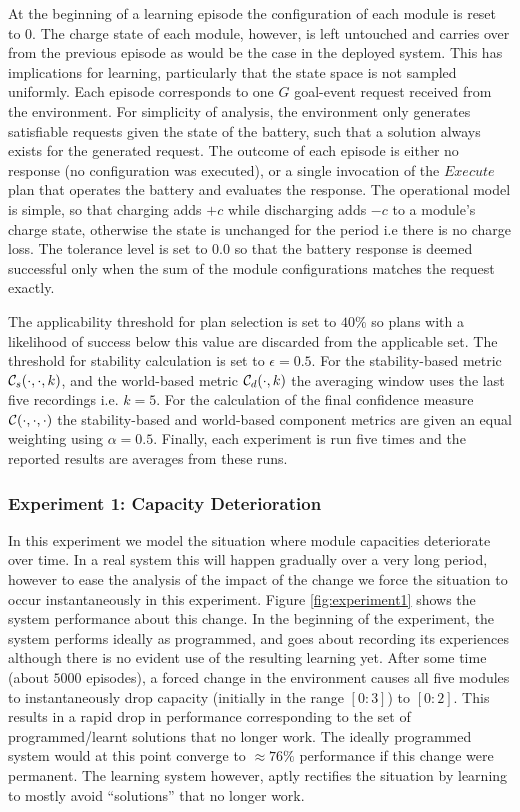 At the beginning of a learning episode the configuration of each module is reset to $0$. The charge state of each module, however, is left untouched and carries over from the previous episode as would be the case in the deployed system. This has implications for learning, particularly that the state space is not sampled uniformly. Each episode corresponds to one $G$ goal-event request received from the environment. For simplicity of analysis, the environment only generates satisfiable requests given the state of the battery, such that a solution always exists for the generated request. The outcome of each episode is either no response (no configuration was executed), or a single invocation of the $Execute$ plan that operates the battery and evaluates the response. The operational model is simple, so that charging adds $+c$ while discharging adds $-c$ to a module's charge state, otherwise the state is unchanged for the period i.e there is no charge loss. The tolerance level is set to $0.0$ so that the battery response is deemed successful only when the sum of the module configurations matches the request exactly.

The applicability threshold for plan selection is set to $40\%$ so plans with a likelihood of success below this value are discarded from the applicable set. The threshold for stability calculation is set to $\epsilon=0.5$. For the stability-based metric ${\mathcal{C}}_s(\cdot,\cdot,k)$, and the world-based metric ${\mathcal{C}}_d(\cdot,k)$ the averaging window uses the last five recordings i.e. $k=5$. For the calculation of the final confidence measure ${\mathcal{C}}(\cdot,\cdot,\cdot)$ the stability-based and world-based component metrics are given an equal weighting using $\alpha=0.5$. Finally, each experiment is run five times and the reported results are averages from these runs.

\subsubsection{Experiment 1: Capacity Deterioration}

In this experiment we model the situation where module capacities deteriorate over time. In a real system this will happen gradually over a very long period, however to ease the analysis of the impact of the change we force the situation to occur instantaneously in this experiment. Figure \ref{fig:experiment1} shows the system performance about this change. In the beginning of the experiment, the system performs ideally as programmed, and goes about recording its experiences although there is no evident use of the resulting learning yet. After some time (about $5000$ episodes), a forced change in the environment causes all five modules to instantaneously drop capacity (initially in the range $[0:3]$) to $[0:2]$. This results in a rapid drop in performance corresponding to the set of programmed/learnt solutions that no longer work. The ideally programmed system would at this point converge to $\approx 76\%$ performance if this change were permanent. The learning system however, aptly rectifies the situation by learning to mostly avoid ``solutions'' that no longer work. 


